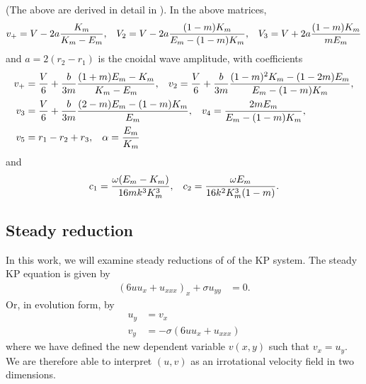 \documentclass[12pt]{article}
\numberwithin{equation}{section}
\begin{document}
(The above are derived in detail in \cite{biondini2023two}). In the above matrices, 
\begin{align}
    v_+ = V-2a\frac{K_m}{K_m-E_m}, \hspace{3mm} V_2 = V-2a\frac{(1-m)K_m}{E_m-(1-m)K_m}, \hspace{3mm} V_3 = V+2a\frac{(1-m)K_m}{mE_m}
\end{align}
and $a = 2(r_2-r_1)$ is the cnoidal wave amplitude, with coefficients
\begin{subequations}
\begin{align}
    v_+&=\frac{V}{6} + \frac{b}{3m}\frac{(1+m)E_m-K_m}{K_m-E_m}, \hspace{3mm} v_2 = \frac{V}{6} + \frac{b}{3m}\frac{(1-m)^2K_m-(1-2m)E_m}{E_m-(1-m)K_m}, \\
    v_3 &= \frac{V}{6} + \frac{b}{3m}\frac{(2-m)E_m - (1-m)K_m}{E_m}, \hspace{3mm} v_4 = \frac{2mE_m}{E_m-(1-m)K_m}, \\
    v_5 &= r_1-r_2+r_3, \hspace{3mm} \alpha = \frac{E_m}{K_m}
\end{align}
\end{subequations}
and
\begin{align}
    c_1 = \frac{\omega(E_m-K_m)}{16mk^3K_m^3}, \hspace{3mm} c_2 = \frac{\omega E_m}{16k^2K_m^3(1-m)}.
\end{align}



\subsection{Steady reduction}
In this work, we will examine steady reductions of of the KP system. The steady KP equation is given by 
\begin{align}
    (6uu_x + u_{xxx})_x + \sigma u_{yy} &= 0 .
    \label{statKP}
\end{align}
Or, in evolution form, by
\begin{subequations}
    \begin{align}
        u_y &= v_x \\
        v_y &= -\sigma(6uu_x + u_{xxx})
    \end{align} \label{steady KP evolution}
\end{subequations}
where we have defined the new dependent variable $v(x,y)$ such that $v_x = u_y$. We are therefore able to interpret $(u,v)$ as an irrotational velocity field in two dimensions.
\end{document}
